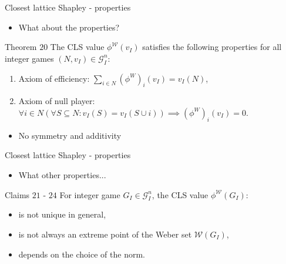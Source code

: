 \documentclass{beamer}
\begin{document}


\begin{frame}{Closest lattice Shapley - properties}

    \begin{itemize}
        \item What about the properties?
    \end{itemize}


    \begin{block}{Theorem $20$}
        The CLS value $\phi^\mathcal{W}(v_I)$ satisfies the following properties for all integer games $(N,v_I) \in \mathcal{G}_I^n$:
        
        \begin{enumerate}
            \item Axiom of efficiency: $\sum_{i \in N}(\phi^W)_{i}(v_I) = v_I(N)$,
            \item Axiom of null player: $\forall i \in N(\forall S \subseteq N: v_I(S)=v_I(S \cup i)) \implies (\phi^W)_{i}(v_I) = 0$.
        \end{enumerate}
    \end{block}


    \begin{itemize}
        \item No symmetry and additivity
    \end{itemize}
\end{frame}



\begin{frame}{Closest lattice Shapley - properties}

    \begin{itemize}
        \item What other properties...
    \end{itemize}


    \begin{block}{Claims $21$ - $24$}
        For integer game $G_I \in \mathcal{G}_I^n$, the CLS value $\phi^\mathcal{W}(G_I)$:
        \begin{itemize}
            \item is not unique in general,
            \item is not always an extreme point of the Weber set $\mathcal{W}(G_I)$,
            \item depends on the choice of the norm.
        \end{itemize}
    \end{block}
\end{frame}
\end{document}
